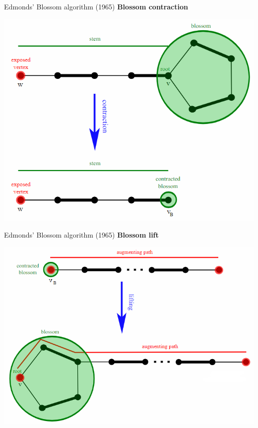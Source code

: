 \begin{frame}[t]{Edmonds' Blossom algorithm (1965)}
	\textbf{Blossom contraction}
	
	\begin{center}
	\includegraphics[width=0.7\linewidth]{img/general/Edmonds_blossom_contraction.png}
	\end{center}
\end{frame}

\begin{frame}[t]{Edmonds' Blossom algorithm (1965)}
	\textbf{Blossom lift}
	
	\begin{center}
		\includegraphics[width=0.75\linewidth]{img/general/Edmonds_blossom_lift.png}
	\end{center}
\end{frame}

